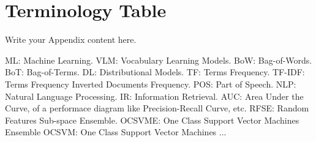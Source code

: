 

\chapter{Terminology Table} %

\label{AppendixX} %

Write your Appendix content here.

ML: Machine Learning.
VLM: Vocabulary Learning Models.
BoW: Bag-of-Words.
BoT: Bag-of-Terms.
DL: Distributional Models.
TF: Terms Frequency.
TF-IDF: Terms Frequency Inverted Documents Frequency.
POS: Part of Speech.
NLP: Natural Language Processing.
IR: Information Retrieval.
AUC: Area Under the Curve, of a performace diagram like Precision-Recall Curve, etc.
RFSE: Random Features Sub-space Ensemble.
OCSVME: One Class Support Vector Machines Ensemble
OCSVM: One Class Support Vector Machines
...


